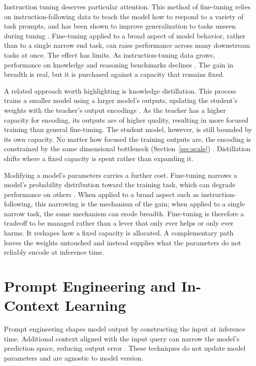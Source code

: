 \documentclass[master]{thesis}
\newcommand{\sref}[1]{Section~\ref{#1}}  %
\begin{document}
Instruction tuning deserves particular attention. This method of fine-tuning relies on instruction-following data to teach the model how to respond to a variety of task prompts, and has been shown to improve generalization to tasks unseen during tuning \cite{instructiontuning2022}. Fine-tuning applied to a broad aspect of model behavior, rather than to a single narrow end task, can raise performance across many downstream tasks at once. The effect has limits. As instruction-tuning data grows, performance on knowledge and reasoning benchmarks declines \cite{alignment_tax2024}. The gain in breadth is real, but it is purchased against a capacity that remains fixed.

A related approach worth highlighting is knowledge distillation. This process trains a smaller model using a larger model's outputs, updating the student's weights with the teacher's output encodings \cite{hinton2015distilling}. As the teacher has a higher capacity for encoding, its outputs are of higher quality, resulting in more focused training than general fine-tuning. The student model, however, is still bounded by its own capacity. No matter how focused the training outputs are, the encoding is constrained by the same dimensional bottleneck (\sref{sec:scale}) \cite{godey2024softmax, costofdownscaling2023}. Distillation shifts where a fixed capacity is spent rather than expanding it.

Modifying a model's parameters carries a further cost. Fine-tuning narrows a model's probability distribution toward the training task, which can degrade performance on others \cite{catastrophic_forgetting2023}. When applied to a broad aspect such as instruction-following, this narrowing is the mechanism of the gain; when applied to a single narrow task, the same mechanism can erode breadth. Fine-tuning is therefore a tradeoff to be managed rather than a lever that only ever helps or only ever harms. It reshapes how a fixed capacity is allocated. A complementary path leaves the weights untouched and instead supplies what the parameters do not reliably encode at inference time.


\section{Prompt Engineering and In-Context Learning}
\label{sec:prompt}

Prompt engineering shapes model output by constructing the input at inference time. Additional context aligned with the input query can narrow the model's prediction space, reducing output error \cite{whendoescontexthelp2026}. These techniques do not update model parameters and are agnostic to model version.
\end{document}
